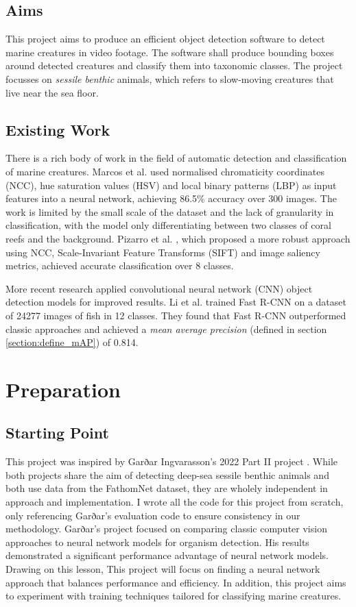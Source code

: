 \documentclass[12pt,a4paper,twoside,openany]{report}
\begin{document}
\section{Aims}
This project aims to produce an efficient object detection software to detect marine creatures in video footage. The software shall produce bounding boxes around detected creatures and classify them into taxonomic classes. The project focusses on \textit{sessile benthic} animals, which refers to slow-moving creatures that live near the sea floor. 

\section{Existing Work}
There is a rich body of work in the field of automatic detection and classification of marine creatures. Marcos et al. \cite{marcos_classification_2005} used normalised chromaticity coordinates (NCC), hue saturation values (HSV) and local binary patterns (LBP) as input features into a neural network, achieving 86.5\% accuracy over 300 images. The work is limited by the small scale of the dataset and the lack of granularity in classification, with the model only differentiating between two classes of coral reefs and the background. Pizarro et al. \cite{pizarro_towards_2008}, which proposed a more robust approach using NCC, Scale-Invariant Feature Transforms (SIFT) and image saliency metrics, achieved accurate classification over 8 classes.

More recent research applied convolutional neural network (CNN) object detection models for improved results. Li et al. \cite{li_fast_2015} trained Fast R-CNN \cite{girshick_fast_2015} on a dataset of 24277 images of fish in 12 classes. They found that Fast R-CNN outperformed classic approaches and achieved a \textit{mean average precision} (defined in section \ref{section:define_mAP}) of 0.814. 

\chapter{Preparation}



\section{Starting Point}
This project was inspired by Garðar Ingvarasson's 2022 Part II project \cite{ingvarsson_deep-sea_2022}. While both projects share the aim of detecting deep-sea sessile benthic animals and both use data from the FathomNet \cite{katija_fathomnet_2022} dataset, they are wholely independent in approach and implementation. I wrote all the code for this project from scratch, only referencing Garðar's evaluation code to ensure consistency in our methodology. Garðar's project focused on comparing classic computer vision approaches to neural network models for organism detection. His results demonstrated a significant performance advantage of neural network models. Drawing on this lesson, This project will focus on finding a neural network approach that balances performance and efficiency. In addition, this project aims to experiment with training techniques tailored for classifying marine creatures.
\end{document}

